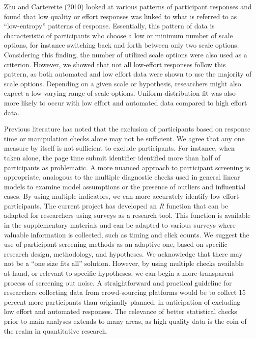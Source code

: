\documentclass[english,man]{apa6}
\theoremstyle{definition}
\theoremstyle{definition}
\theoremstyle{definition}
\theoremstyle{remark}
\begin{document}
Zhu and Carterette (2010) looked at various patterns of participant
responses and found that low quality or effort responses was linked to
what is referred to as \enquote{low-entropy} patterns of response.
Essentially, this pattern of data is characteristic of participants who
choose a low or minimum number of scale options, for instance switching
back and forth between only two scale options. Considering this finding,
the number of utilized scale options were also used as a criterion.
However, we showed that not all low-effort responses follow this
pattern, as both automated and low effort data were shown to use the
majority of scale options. Depending on a given scale or hypothesis,
researchers might also expect a low-varying range of scale options.
Uniform distribution fit was also more likely to occur with low effort
and automated data compared to high effort data.

Previous literature has noted that the exclusion of participants based
on response time or manipulation checks alone may not be sufficient. We
agree that any one measure by itself is not sufficient to exclude
participants. For instance, when taken alone, the page time submit
identifier identified more than half of participants as problematic. A
more nuanced approach to participant screening is appropriate, analogous
to the multiple diagnostic checks used in general linear models to
examine model assumptions or the presence of outliers and influential
cases. By using multiple indicators, we can more accurately identify low
effort participants. The current project has developed an \emph{R}
function that can be adapted for researchers using surveys as a research
tool. This function is available in the supplementary materials and can
be adapted to various surveys where valuable information is collected,
such as timing and click counts. We suggest the use of participant
screening methods as an adaptive one, based on specific research design,
methodology, and hypotheses. We acknowledge that there may not be a
\enquote{one size fits all} solution. However, by using multiple checks
available at hand, or relevant to specific hypotheses, we can begin a
more transparent process of screening out noise. A straightforward and
practical guideline for researchers collecting data from crowd-sourcing
platforms would be to collect 15 percent more participants than
originally planned, in anticipation of excluding low effort and
automated responses. The relevance of better statistical checks prior to
main analyses extends to many areas, as high quality data is the coin of
the realm in quantitative research.
\end{document}
